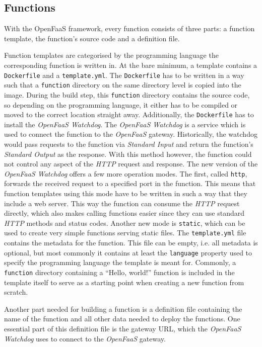 \subsection{Functions}

With the OpenFaaS framework, every function consists of three parts: a function template, the
function's source code and a definition file.

Function templates are categorised by the programming language the corresponding function is written
in. At the bare minimum, a template contains a \texttt{Dockerfile} and a \texttt{template.yml}. The
\texttt{Dockerfile} has to be written in a way such that a \texttt{function} directory on the same
directory level is copied into the image. During the build step, this \texttt{function} directory
contains the source code, so depending on the programming language, it either has to be compiled or
moved to the correct location straight away. Additionally, the \texttt{Dockerfile} has to install
the \textit{OpenFaaS Watchdog}. The \textit{OpenFaaS Watchdog} is a service which is used to connect
the function to the \textit{OpenFaaS} gateway. Historically, the watchdog would pass requests to the
function via \textit{Standard Input} and return the function's \textit{Standard Output} as the
response. With this method however, the function could not control any aspect of the \textit{HTTP}
request and response. The new version of the \textit{OpenFaaS Watchdog} offers a few more operation
modes. The first, called \texttt{http}, forwards the received request to a specified port in the
function. This means that function templates using this mode have to be written in such a way that
they include a web server. This way the function can consume the \textit{HTTP} request directly,
which also makes calling functions easier since they can use standard \textit{HTTP} methods and
status codes. Another new mode is \texttt{static}, which can be used to create very simple functions
serving static files. \cite{of-watchdog} The \texttt{template.yml} file contains the metadata for
the function. This file can be empty, i.e. all metadata is optional, but most commonly it contains
at least the \texttt{language} property used to specify the programming language the template is
meant for. \cite{openfaas-build-functions} Commonly, a \texttt{function} directory containing a
“Hello, world!” function is included in the template itself to serve as a starting point when
creating a new function from scratch.

Another part needed for building a function is a definition file containing the name of the function
and all other data needed to deploy the functions. One essential part of this definition file is the
gateway URL, which the \textit{OpenFaaS Watchdog} uses to connect to the \textit{OpenFaaS} gateway.

